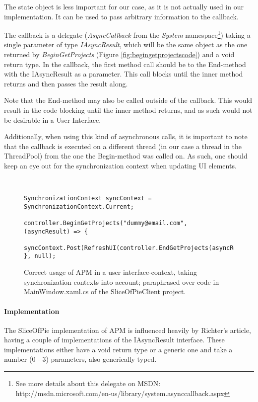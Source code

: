 The state object is less important for our case, as it is not actually used in our implementation. It can be used
to pass arbitrary information to the callback.

The callback is a delegate (\emph{AsyncCallback} from the \emph{System} namespace\footnote{See more details about this delegate on MSDN: http://msdn.microsoft.com/en-us/library/system.asynccallback.aspx})
taking a single parameter of type \emph{IAsyncResult}, which will be the same object as the one
returned by \emph{BeginGetProjects} (Figure \ref{fig:begingetprojectscode}) and a void return type.
In the callback, the first method call should be to the End-method with the IAsyncResult
as a parameter. This call blocks until the inner method returns and then passes the result along.

Note that the End-method may also be called outside of the callback. This would result in the code
blocking until the inner method returns, and as such would not be desirable in a User Interface.

Additionally, when using this kind of asynchronous calls, it is important to note that the callback
is executed on a different thread (in our case a thread in the ThreadPool) from the one the Begin-method
was called on. As such, one should keep an eye out for the synchronization context when updating UI
elements.\cite[p.~622]{Griffiths2010}

\begin{figure}[hbt]
    \begin{verbatim}
    
    
SynchronizationContext syncContext = SynchronizationContext.Current;

controller.BeginGetProjects("dummy@email.com", (asyncResult) => {
    syncContext.Post(RefreshUI(controller.EndGetProjects(asyncResult)))
}, null);\end{verbatim}
    \caption{Correct usage of APM in a user interface-context, taking synchronization contexts into account; paraphrased over code in MainWindow.xaml.cs of the SliceOfPieClient project.}
    \label{fig:apmuserinterfacecode}
\end{figure}

\paragraph{Implementation}

The SliceOfPie implementation of APM is influenced heavily by Richter's article, having a couple of
implementations of the IAsyncResult interface. These implementations either have a void return type
or a generic one and take a number (0 - 3) parameters, also generically typed.

